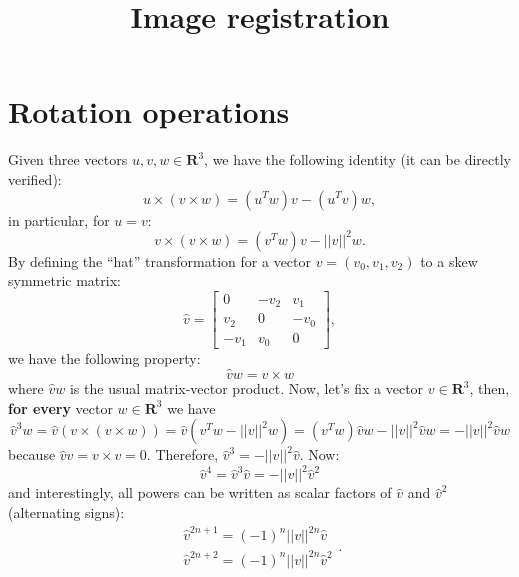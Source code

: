 \documentclass[11pt]{article}
\title{\textbf{Image registration}}
\date{}
\begin{document}
\maketitle
\section{Rotation operations}
Given three vectors $u,v,w \in \mathbf{R}^3$, we have the following identity (it can be directly verified):
\begin{equation}
    u\times(v \times w) = (u^T w)v - (u^T v)w,
\end{equation}
in particular, for $u=v$:
\begin{equation}
    v\times(v \times w) = (v^T w)v - ||v||^2w.
\end{equation}
By defining the ``hat'' transformation for a vector $v=(v_0, v_1, v_2)$ to a skew symmetric matrix:
\begin{equation}
    \hat{v} = \left[\begin{array}{ccc}
        0 & -v_2 & v_1 \\
        v_2 & 0 & -v_0 \\
        -v_1 & v_0 & 0
    \end{array}\right],
\end{equation}
we have the following property:
\begin{equation}
    \hat{v}w = v \times w
\end{equation}
where $\hat{v}w$ is the usual matrix-vector product. Now, let's fix a vector $v\in \mathbf{R}^{3}$, then, \textbf{for every} vector $w\in \mathbf{R}^{3}$ we have
\begin{equation}
    \hat{v}^{3}w = \hat{v}(v\times (v \times w)) = \hat{v}(v^T w - ||v||^2 w) = (v^T w)\hat{v}w - ||v||^{2}\hat{v}w = - ||v||^{2}\hat{v}w
\end{equation}
because $\hat{v}v=v \times v = 0$. Therefore, $\hat{v}^{3} = -||v||^{2}\hat{v}$. Now:
\begin{equation}
    \hat{v}^{4} = \hat{v}^{3}\hat{v} = -||v||^{2}\hat{v}^{2}
\end{equation}
and interestingly, all powers can be written as scalar factors of $\hat{v}$ and $\hat{v}^{2}$ (alternating signs):
\begin{equation}
    \begin{array}{l}
        \hat{v}^{2n+1} = (-1)^{n}||v||^{2n}\hat{v}\\
        \hat{v}^{2n+2} = (-1)^{n}||v||^{2n}\hat{v}^{2}
    \end{array}.
\end{equation}
\end{document}
